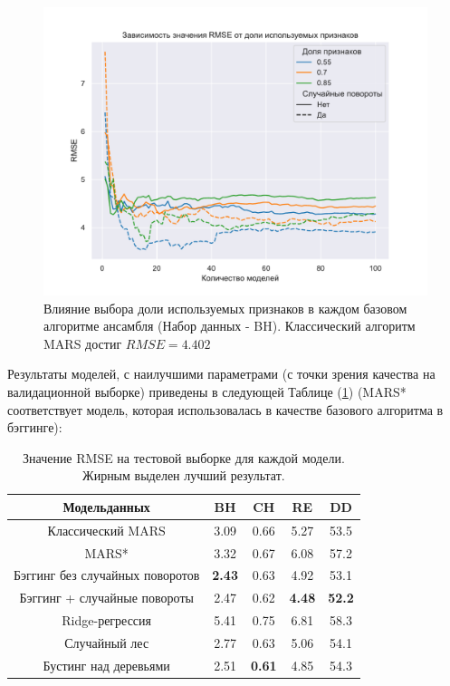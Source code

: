 \documentclass{article}
\begin{document}
\begin{figure}[H] %
\begin{center}
    \includegraphics[scale=0.55]{figures/be_subsample.pdf}
    \caption{Влияние выбора доли используемых признаков в каждом базовом алгоритме ансамбля (Набор данных - BH). Классический алгоритм MARS достиг $RMSE = 4.402$}\label{fig::2}
\end{center}
\end{figure}

Результаты моделей, с наилучшими параметрами (с точки зрения качества на валидационной выборке) приведены в следующей Таблице (\ref{tab:1})
(MARS* соответствует модель, которая использовалась в качестве базового алгоритма в бэггинге):

\begin{table}[h!]
\begin{center}
\begin{tabular}{|c|c|c|c|c|}
\hline
Модель данных & BH & CH & RE & DD\\
    \hline
    Классический MARS  & 3.09 &  0.66 &  5.27 &  53.5\\
    \hline
    MARS* & 3.32 &  0.67 &  6.08 &  57.2\\
    \hline
    Бэггинг без случайных поворотов  & \textbf{2.43} & 0.63 &  4.92 &  53.1\\
    \hline
    Бэггинг + 
    случайные повороты & 2.47 & 0.62 &  \textbf{4.48} &  \textbf{52.2}\\
    \hline
    Ridge-регрессия  & 5.41 &  0.75 &  6.81 &  58.3\\
    \hline
    Случайный лес  & 2.77 & 0.63 & 5.06 &  54.1\\
    \hline
    Бустинг над 
    деревьями & 2.51 &  \textbf{0.61} &  4.85 &  54.3\\
    \hline
\end{tabular}
\caption{\label{tab:1} Значение RMSE на тестовой выборке для каждой модели. Жирным выделен лучший результат.}
\end{center}
\end{table}
\end{document}
